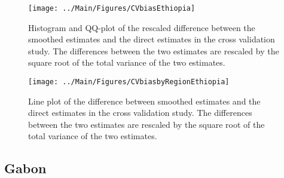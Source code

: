 \documentclass[12pt]{article}\usepackage[]{graphicx}\usepackage[]{color}
\newenvironment{knitrout}{}{} %
\begin{document}
\begin{knitrout}
\color{fgcolor}\begin{figure}[bht]

{\centering \texttt{[image: ../Main/Figures/CVbiasEthiopia]} 

}

\caption[Histogram and QQ-plot of the rescaled difference between the smoothed estimates and the direct estimates in the cross validation study]{Histogram and QQ-plot of the rescaled difference between the smoothed estimates and the direct estimates in the cross validation study. The differences between the two estimates are rescaled by the square root of the total variance of the two estimates.}\label{fig:unnamed-chunk-119}
\end{figure}


\end{knitrout}

\begin{knitrout}
\color{fgcolor}\begin{figure}[bht]

{\centering \texttt{[image: ../Main/Figures/CVbiasbyRegionEthiopia]} 

}

\caption[Line plot of the difference between smoothed estimates and the direct estimates in the cross validation study]{Line plot of the difference between smoothed estimates and the direct estimates in the cross validation study. The differences between the two estimates are rescaled by the square root of the total variance of the two estimates.}\label{fig:unnamed-chunk-120}
\end{figure}


\end{knitrout}


\clearpage
\subsection{Gabon}


\end{document}
